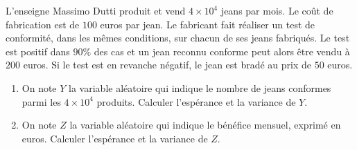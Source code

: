 \documentclass{article}
\begin{document}
%
%
L'enseigne \og Massimo Dutti \fg{} produit et vend $4\times10^{4}$ jeans par mois. Le coût de fabrication est de $100$ euros par jean. Le fabricant fait réaliser un test de conformité, dans les mêmes conditions, sur chacun de ses jeans fabriqués. Le test est positif dans $90\%$ des cas et un jean reconnu conforme peut alors être vendu à $200$ euros. Si le test est en revanche négatif, le jean est bradé au prix de $50$ euros. 
\begin{enumerate}
\item On note $Y$ la variable aléatoire qui indique le nombre de jeans conformes parmi les $4\times10^{4}$ produits.  Calculer l'espérance et la variance de $Y$. 
\item On note $Z$ la variable aléatoire qui indique le bénéfice mensuel, exprimé en euros. Calculer l'espérance et la variance de $Z$.
\end{enumerate}
\end{document}
